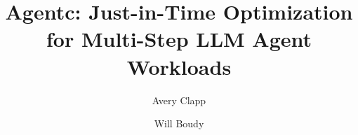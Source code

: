 \documentclass[sigconf,9pt]{acmart}
\begin{document}

\title{Agentc: Just-in-Time Optimization for Multi-Step LLM Agent Workloads}

\author{Avery Clapp}

\author{Will Boudy}
\end{document}

